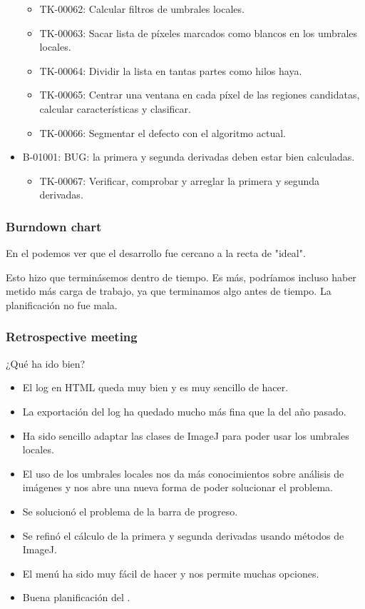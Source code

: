 \begin{itemize}
  \begin{itemize}
   \item TK-00062: Calcular filtros de umbrales locales.
   \item TK-00063: Sacar lista de píxeles marcados como blancos en los umbrales locales.
   \item TK-00064: Dividir la lista en tantas partes como hilos haya.
   \item TK-00065: Centrar una ventana en cada píxel de las regiones candidatas, calcular características y clasificar.
   \item TK-00066: Segmentar el defecto con el algoritmo actual.
  \end{itemize}
 \item B-01001: BUG: la primera y segunda derivadas deben estar bien calculadas.
  \begin{itemize}
   \item TK-00067: Verificar, comprobar y arreglar la primera y segunda derivadas.
  \end{itemize}
\end{itemize}

\subsubsection*{Burndown chart}
En el \burndownchart{}  podemos ver que el desarrollo fue cercano a la recta de "ideal".


Esto hizo que terminásemos dentro de tiempo. Es más, podríamos incluso haber metido más carga de trabajo, ya que terminamos algo antes de tiempo. La planificación no fue mala.

\subsubsection*{Retrospective meeting}
¿Qué ha ido bien?
\begin{itemize}
 \item El log en HTML queda muy bien y es muy sencillo de hacer.
 \item La exportación del log ha quedado mucho más fina que la del año pasado.
 \item Ha sido sencillo adaptar las clases de ImageJ para poder usar los umbrales locales.
 \item El uso de los umbrales locales nos da más conocimientos sobre análisis de imágenes y nos abre una nueva forma de poder solucionar el problema.
 \item Se solucionó el problema de la barra de progreso.
 \item Se refinó el cálculo de la primera y segunda derivadas usando métodos de ImageJ.
 \item El menú ha sido muy fácil de hacer y nos permite muchas opciones.
 \item Buena planificación del \sprint{}.
\end{itemize}

